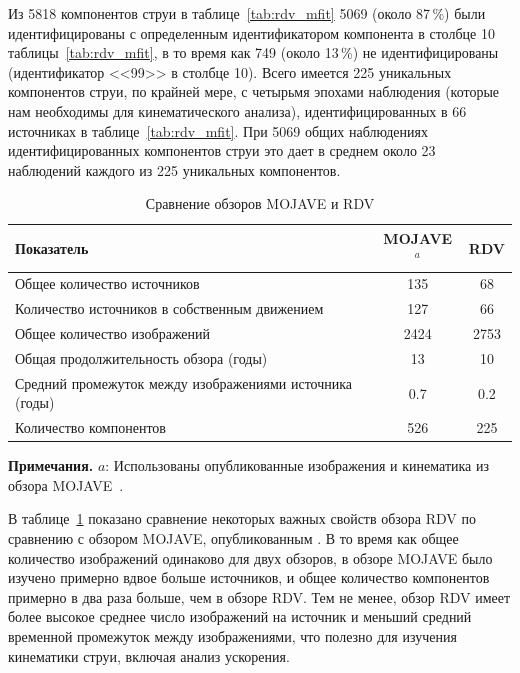 Из 5818 компонентов струи в таблице~\ref{tab:rdv_mfit} 5069 (около 87\,\%) были идентифицированы с
определенным идентификатором компонента в столбце 10 таблицы~\ref{tab:rdv_mfit}, в то время как 749
(около 13\,\%) не идентифицированы (идентификатор <<99>> в столбце 10). Всего имеется 225 уникальных
компонентов струи, по крайней мере, с четырьмя эпохами наблюдения (которые нам необходимы для
кинематического анализа), идентифицированных в 66 источниках в таблице~\ref{tab:rdv_mfit}. При 5069
общих наблюдениях идентифицированных компонентов струи это дает в среднем около 23 наблюдений
каждого из 225 уникальных компонентов.

\begin{table}[tbh]
\caption{Сравнение обзоров MOJAVE и RDV}
\label{tab:rdv_comptab}
\small
\centering
\begin{tabular}{l c c}
\toprule
Показатель & MOJAVE$^{a}$ & RDV \\
\midrule
Общее количество источников                             & 135  & 68   \\
Количество источников в собственным движением           & 127  & 66   \\
Общее количество изображений                            & 2424 & 2753 \\
Общая продолжительность обзора (годы)                   & 13   & 10   \\
Средний промежуток между изображениями источника (годы) & 0.7  & 0.2  \\
Количество компонентов                                  & 526  & 225  \\
\bottomrule
\end{tabular}

\textbf{Примечания.}
$a$: Использованы опубликованные изображения и кинематика из обзора
MOJAVE~\cite{Lister_2009a,Lister_2009b}.
\end{table}

В таблице~\ref{tab:rdv_comptab} показано сравнение некоторых важных свойств обзора RDV по сравнению
с обзором MOJAVE, опубликованным \cite{Lister_2009a,Lister_2009b}. В то время как общее количество
изображений одинаково для двух обзоров, в обзоре MOJAVE было изучено примерно вдвое больше
источников, и общее количество компонентов примерно в два раза больше, чем в обзоре RDV. Тем не
менее, обзор RDV имеет более высокое среднее число изображений на источник и меньший средний
временной промежуток между изображениями, что полезно для изучения кинематики струи, включая анализ
ускорения.


